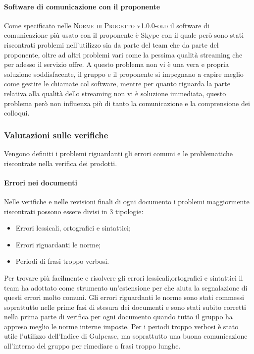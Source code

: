 \documentclass[../piano-di-qualifica.tex]{subfiles}
\begin{document}
\paragraph{Software di comunicazione con il proponente}
\label{sub:latex}
Come specificato nelle \textsc{Norme di Progetto v1.0.0-old} il software di comunicazione più usato con il proponente è Skype con il quale però sono stati riscontrati problemi nell'utilizzo sia da parte del team che da parte del proponente, oltre ad altri problemi vari come la pessima qualità streaming che per adesso il servizio offre.
A questo problema non vi è una vera e propria soluzione soddisfacente, il gruppo e il proponente si impegnano a capire meglio come gestire le chiamate col software, mentre per quanto riguarda la parte relativa alla qualità dello streaming non vi è soluzione immediata, questo problema però non influenza più di tanto la comunicazione e la comprensione dei colloqui.

\subsubsection{Valutazioni sulle verifiche}
\label{sssec:valutazioni_verifiche}
Vengono definiti i problemi riguardanti gli errori comuni e le problematiche riscontrate nella verifica dei prodotti.

\paragraph{Errori nei documenti}
\label{sub:errori_documenti}
Nelle verifiche e nelle revisioni finali di ogni documento i problemi maggiormente riscontrati possono essere divisi in 3 tipologie:
\begin{itemize}
    \item Errori lessicali, ortografici e sintattici;
    \item Errori riguardanti le norme;
    \item Periodi di frasi troppo verbosi.
\end{itemize}
Per trovare più facilmente e risolvere gli errori lessicali,ortografici e sintattici il team ha adottato come strumento un'estensione per  che aiuta la segnalazione di questi errori molto comuni.
Gli errori riguardanti le norme sono stati commessi soprattutto nelle prime fasi di stesura dei documenti e sono stati subito corretti nella prima parte di verifica per ogni documento quando tutto il gruppo ha appreso meglio le norme interne imposte.
Per i periodi troppo verbosi è stato utile l'utilizzo dell'Indice di Gulpease, ma soprattutto una buona comunicazione all'interno del gruppo per rimediare a frasi troppo lunghe.
\end{document}
